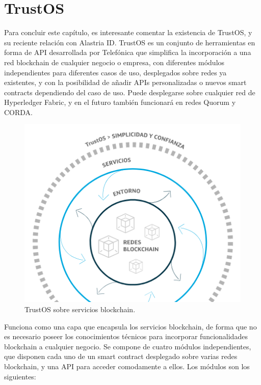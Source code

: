 \section{TrustOS}
Para concluir este capítulo, es interesante comentar la existencia de TrustOS, y su reciente relación con Alastria ID.
TrustOS es un conjunto de herramientas en forma de API desarrollada por Telefónica que simplifica la incorporación a una red blockchain de cualquier negocio o empresa, con diferentes módulos independientes para diferentes casos de uso, desplegados sobre redes ya existentes, y con la posibilidad de añadir APIs personalizadas o nuevos smart contracts dependiendo del caso de uso. Puede desplegarse sobre cualquier red de Hyperledger Fabric, y en el futuro también funcionará en redes Quorum y CORDA.
\begin{figure}[H]
\centerline{\includegraphics[scale=1]{recursos/trustos.png}}
\caption{TrustOS sobre servicios blockchain.}
\label{trustos}
\end{figure}
Funciona como una capa que encapsula los servicios blockchain, de forma que no es necesario poseer los conocimientos técnicos para incorporar funcionalidades blockchain a cualquier negocio. Se compone de cuatro módulos independientes, que disponen cada uno de un smart contract desplegado sobre varias redes blockchain, y una API para acceder comodamente a ellos. Los módulos son los siguientes:
